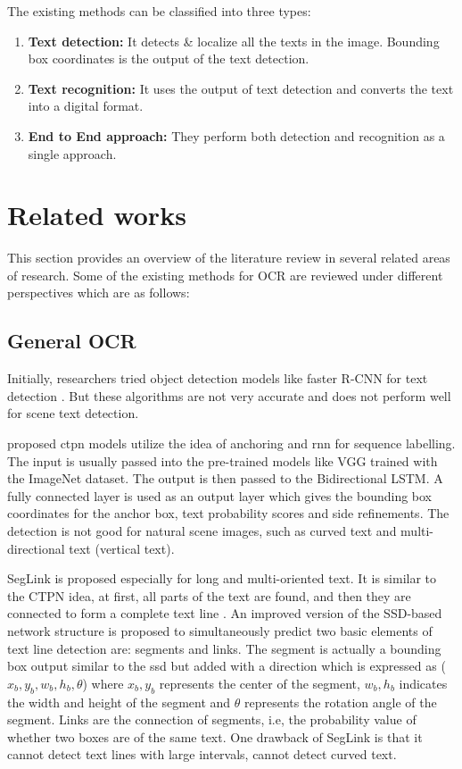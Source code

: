 The existing methods can be classified into three types:
\begin{enumerate}
\item \textbf{Text detection:} It detects \& localize all the texts in the image. Bounding box coordinates is the output of the text detection.
\item \textbf{Text recognition:} It uses the output of text detection and converts the text into a digital format.
\item \textbf{End to End approach:} They perform both detection and recognition as a single approach.
\end{enumerate} 
\section{Related works}
This section provides an overview of the literature review in several related areas of research. Some of the existing methods for OCR are reviewed under different perspectives which are as follows:
\subsection{General OCR}
	Initially, researchers tried object detection models like faster R-CNN for text detection \citep{nagaoka2017text,zhong2019anchor}. But these algorithms are not very accurate and does not perform well for scene text detection.
\newline	
	
	\cite{tian2016detecting} proposed \gls{ctpn} models utilize the idea of anchoring and \gls{rnn} for sequence labelling. The input is usually passed into the pre-trained models like VGG trained with the ImageNet dataset. The output is then passed to the Bidirectional LSTM. A fully connected layer is used as an output layer which gives the bounding box coordinates for the anchor box, text probability scores and side refinements. The detection is not good for natural scene images, such as curved text and multi-directional text (vertical text).
\newline	
	
	SegLink is proposed especially for long and multi-oriented text. It is similar to the CTPN idea, at first, all parts of the text are found, and then they are connected to form a complete text line \citep{shi2017detecting}. An improved version of the SSD-based network structure is proposed to simultaneously predict two basic elements of text line detection are: segments and links. The segment is actually a bounding box output similar to the \gls{ssd} but added with a direction which is expressed as ($x_b,y_b,w_b,h_b,\theta$) where $x_b, y_b$ represents the center of the segment, $w_b, h_b$ indicates the width and height of the segment and $\theta$ represents the rotation angle of the segment. Links are the connection of segments, i.e, the probability value of whether two boxes are of the same text. One drawback of SegLink is that it cannot detect text lines with large intervals, cannot detect curved text.
\newline
	
